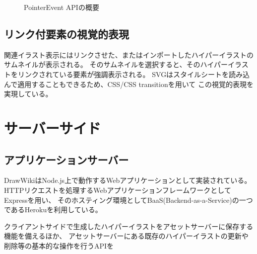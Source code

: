 \begin{figure}[htbp]
    \begin{center}
         \end{center}
    \caption{PointerEvent APIの概要}
\end{figure}

\subsection{リンク付要素の視覚的表現}
関連イラスト表示にはリンクさせた、またはインポートしたハイパーイラストのサムネイルが表示される。
そのサムネイルを選択すると、そのハイパーイラストをリンクされている要素が強調表示される。
SVGはスタイルシートを読み込んで適用することもできるため、CSS/CSS transitionを用いて
この視覚的表現を実現している。


\section{サーバーサイド}

\subsection{アプリケーションサーバー}
DrawWikiはNode.js上で動作するWebアプリケーションとして実装されている。
HTTPリクエストを処理するWebアプリケーションフレームワークとしてExpressを用い、
そのホスティング環境としてBaaS(Backend-as-a-Service)の一つであるHerokuを利用している。

クライアントサイドで生成したハイパーイラストをアセットサーバーに保存する機能を備えるほか、
アセットサーバーにある既存のハイパーイラストの更新や削除等の基本的な操作を行うAPIを

